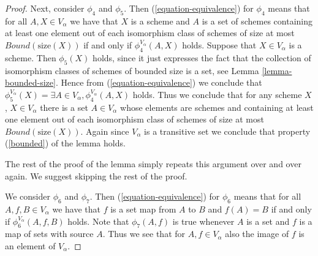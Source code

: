 \begin{proof}
\medskip\noindent
Next, consider $\phi_4$ and $\phi_5$. Then (\ref{equation-equivalence})
for $\phi_4$ means that 
for all $A, X \in V_\alpha$ we have that $X$ is a scheme
and $A$ is a set of schemes containing at least one
element out of each isomorphism class of schemes of 
size at most $Bound(\text{size}(X))$ if and only
if $\phi_4^{V_\alpha}(A, X)$ holds.  Suppose that
$X\in V_\alpha$ is a scheme. Then $\phi_5(X)$ holds,
since it just expresses the fact that
the collection of isomorphism classes of schemes
of bounded size is a set, see Lemma \ref{lemma-bounded-size}.
Hence from (\ref{equation-equivalence}) we conclude that
$\phi_5^{V_\alpha}(X) =
\exists A \in V_\alpha, \phi_4^{V_\alpha}(A, X)$ holds.
Thus we conclude that for any scheme $X$, $X \in V_\alpha$
there is a set $A \in V_\alpha$ whose elements are schemes
and containing at least one
element out of each isomorphism class of schemes of 
size at most $Bound(\text{size}(X))$. Again since
$V_\alpha$ is a transitive set we conclude that
property (\ref{bounded}) of the lemma holds.

\medskip\noindent
The rest of the proof of the lemma simply repeats this argument
over and over again. We suggest skipping the rest of the proof.

\medskip\noindent
We consider $\phi_6$ and $\phi_7$. Then (\ref{equation-equivalence})
for $\phi_6$ means that for all $A, f, B \in V_\alpha$ we have that
$f$ is a set map from $A$ to $B$ and $f(A) = B$
if and only if $\phi_6^{V_\alpha}(A, f, B)$ holds.
Note that $\phi_7(A, f)$ is true whenever $A$ is a set
and $f$ is a map of sets with source $A$. Thus we see that
for $A, f \in V_\alpha$ also the image of $f$ is an element
of $V_\alpha$.










\end{proof}







